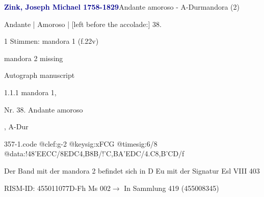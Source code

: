\documentclass[twocolumn]{book}
\begin{document}
\par \vspace{7pt} \textcolor{darkblue}{\textbf{Zink, Joseph Michael  1758-1829}}\hfillplus{\textbf{[357]}}\newline Andante amoroso - A-Dur\newline mandora (2)
\par \begin{itshape}[f.22v, at left:] Andante | Amoroso | [left before the accolade:] 38.\end{itshape} 
\par \textcolor{darkblue}{}  1 Stimmen: mandora 1  (f.22v)\newline \begin{small} mandora 2 missing\end{small} \newline Autograph manuscript
\par 1.1.1  mandora 1, \begin{itshape}Nr. 38. Andante amoroso\end{itshape}, A-Dur  
\begin{filecontents*}{357-1.code}
@clef:g-2
@keysig:xFCG
@timesig:6/8
@data:!48'EECC/8EDC4,B8B/!{'C,B}A'EDC/4.C8,B'CD/f
\end{filecontents*}
\newline
%
\par Der Band mit der mandora 2 befindet sich in D Eu mit der Signatur Esl VIII 403
\par RISM-ID: 455011077\newline D-Fh  Ms 002\newline $\rightarrow$ In Sammlung 419 (455008345)
      
\end{document}
